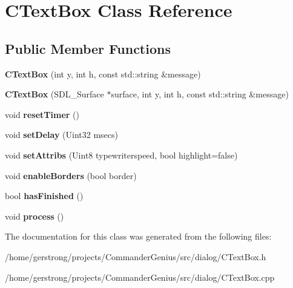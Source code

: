\hypertarget{class_c_text_box}{
\section{CTextBox Class Reference}
\label{class_c_text_box}
}
\subsection*{Public Member Functions}
\begin{DoxyCompactItemize}
\item 
\hypertarget{class_c_text_box_a9ec03985945f22cd52bb43e27457bb72}{
{\bfseries CTextBox} (int y, int h, const std::string \&message)}
\label{class_c_text_box_a9ec03985945f22cd52bb43e27457bb72}

\item 
\hypertarget{class_c_text_box_a7a35f9f90145ce409673ed4acb101dad}{
{\bfseries CTextBox} (SDL\_\-Surface $\ast$surface, int y, int h, const std::string \&message)}
\label{class_c_text_box_a7a35f9f90145ce409673ed4acb101dad}

\item 
\hypertarget{class_c_text_box_a90e65406b0c80b7d61d6f4443137dee9}{
void {\bfseries resetTimer} ()}
\label{class_c_text_box_a90e65406b0c80b7d61d6f4443137dee9}

\item 
\hypertarget{class_c_text_box_a71a637f5ea0190311e05c8468d89bacf}{
void {\bfseries setDelay} (Uint32 msecs)}
\label{class_c_text_box_a71a637f5ea0190311e05c8468d89bacf}

\item 
\hypertarget{class_c_text_box_a796bbe90f3bfcff9a9a85ad00a56531a}{
void {\bfseries setAttribs} (Uint8 typewriterspeed, bool highlight=false)}
\label{class_c_text_box_a796bbe90f3bfcff9a9a85ad00a56531a}

\item 
\hypertarget{class_c_text_box_a9b6b2640615d55d8e00aa5dabde80db2}{
void {\bfseries enableBorders} (bool border)}
\label{class_c_text_box_a9b6b2640615d55d8e00aa5dabde80db2}

\item 
\hypertarget{class_c_text_box_a73fc05c6424c14e01408bc5fd2886d43}{
bool {\bfseries hasFinished} ()}
\label{class_c_text_box_a73fc05c6424c14e01408bc5fd2886d43}

\item 
\hypertarget{class_c_text_box_a12fa18cba426209dcbd65810c57e9498}{
void {\bfseries process} ()}
\label{class_c_text_box_a12fa18cba426209dcbd65810c57e9498}

\end{DoxyCompactItemize}


The documentation for this class was generated from the following files:\begin{DoxyCompactItemize}
\item 
/home/gerstrong/projects/CommanderGenius/src/dialog/CTextBox.h\item 
/home/gerstrong/projects/CommanderGenius/src/dialog/CTextBox.cpp\end{DoxyCompactItemize}
